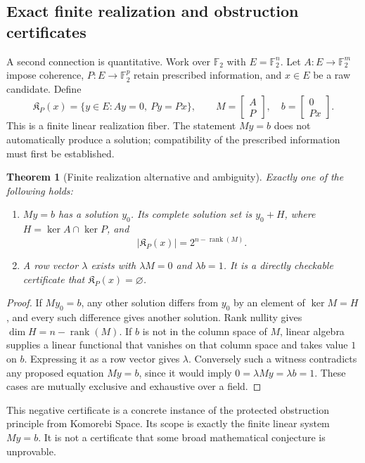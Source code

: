 \documentclass[11pt,oneside]{article}
\newtheorem{theorem}{Theorem}[section]
\theoremstyle{definition}
\theoremstyle{remark}
\begin{document}
\subsection{Exact finite realization and obstruction certificates}

A second connection is quantitative. Work over $\mathbb F_2$ with $E=\mathbb F_2^n$. Let $A:E\to\mathbb F_2^m$ impose coherence, $P:E\to\mathbb F_2^p$ retain prescribed information, and $x\in E$ be a raw candidate. Define
\[
\mathfrak K_P(x)=\{y\in E:Ay=0,\ Py=Px\},\qquad
M=\begin{bmatrix}A\\P\end{bmatrix},\quad
b=\begin{bmatrix}0\\Px\end{bmatrix}.
\]
This is a finite linear realization fiber. The statement $My=b$ does not automatically produce a solution; compatibility of the prescribed information must first be established.

\begin{theorem}[Finite realization alternative and ambiguity]
Exactly one of the following holds:
\begin{enumerate}[label=\textup{(\roman*)}]
\item $My=b$ has a solution $y_0$. Its complete solution set is $y_0+H$, where $H=\ker A\cap\ker P$, and
\[
|\mathfrak K_P(x)|=2^{n-\operatorname{rank}(M)}.
\]
\item A row vector $\lambda$ exists with $\lambda M=0$ and $\lambda b=1$. It is a directly checkable certificate that $\mathfrak K_P(x)=\varnothing$.
\end{enumerate}
\end{theorem}
\begin{proof}
If $My_0=b$, any other solution differs from $y_0$ by an element of $\ker M=H$, and every such difference gives another solution. Rank nullity gives $\dim H=n-\operatorname{rank}(M)$. If $b$ is not in the column space of $M$, linear algebra supplies a linear functional that vanishes on that column space and takes value $1$ on $b$. Expressing it as a row vector gives $\lambda$. Conversely such a witness contradicts any proposed equation $My=b$, since it would imply $0=\lambda My=\lambda b=1$. These cases are mutually exclusive and exhaustive over a field.
\end{proof}

This negative certificate is a concrete instance of the protected obstruction principle from Komorebi Space. Its scope is exactly the finite linear system $My=b$. It is not a certificate that some broad mathematical conjecture is unprovable.
\end{document}
